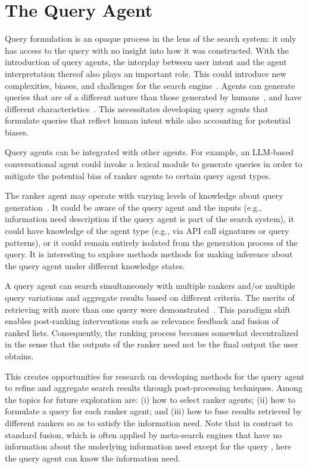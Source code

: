 \section{The Query Agent}
\label{sec:query-agent}
Query formulation is an opaque process in the lens of the search system: it only has access to the query with no insight into how it was constructed.
With the introduction of query agents, the interplay between user intent and the agent interpretation thereof also plays an important role.
This could introduce new complexities, biases, and challenges for the search engine~\cite{ranking-manipulation-conversational}.
Agents can generate queries that are of a different nature than those generated by humans~\cite{llm-query-variations}, and have different characteristics~\cite{query-generation-personality}. 
This necessitates developing query agents that formulate queries that reflect human intent while also accounting for potential biases. 

Query agents can be integrated with other agents. For example, an LLM-based conversational agent could invoke a lexical module to generate queries in order to mitigate the potential bias of ranker agents to certain query agent types. 

The ranker agent may operate with varying levels of knowledge about query generation~\cite{query-rewrite-for-rag}.
It could be aware of the query agent and the inputs (e.g., information need description if the query agent is part of the search system), it could have knowledge of the agent type (e.g., via API call signatures or query patterns), or it could remain entirely isolated from the generation process of the query. It is interesting to explore methods 
methods for making inference about the query agent under different knowledge states. 

A query agent can search simultaneously with multiple rankers and/or multiple query variations and aggregate results based on different criteria.  
The merits of retrieving with more than one query were demonstrated~\cite{mult-queries-benefit}. 
This paradigm shift enables post-ranking interventions such as relevance feedback and fusion of ranked lists. 
Consequently, the ranking process becomes somewhat decentralized in the sense that the outputs of the ranker need not be the final output the user obtains. 

This creates opportunities for research on developing methods for the query agent to refine and aggregate search results through post-processing techniques.
Among the topics for future exploration are: (i) how to select ranker agents; (ii) how to formulate a query for each ranker agent; and (iii) how to fuse results retrieved by different rankers so as to satisfy the information need. Note that in contrast to standard fusion, which is often applied by meta-search engines that have no information about the underlying information need except for the query \cite{Kurland+Culpepper:18a}, here the query agent can know the information need. 

